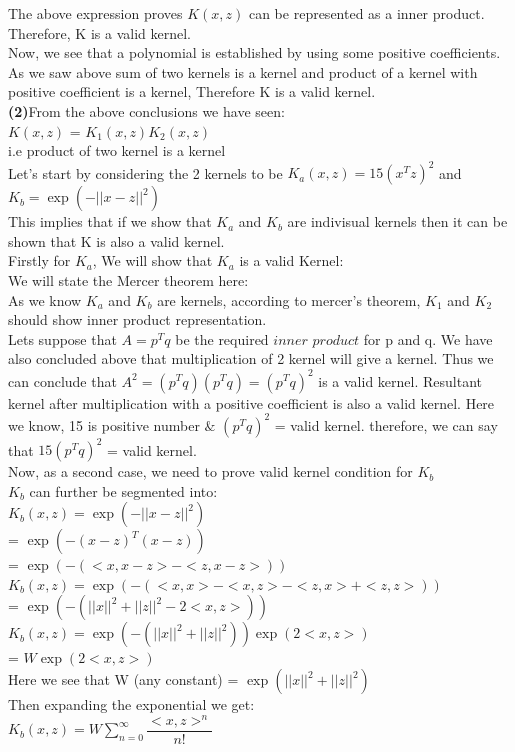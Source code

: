 \documentclass[11pt]{article}
\renewcommand\part[1]{\vspace{.10in}\textbf{(#1)}}
\begin{document}
The above expression proves $K(x,z)$ can be represented as a inner product. Therefore, K is a valid kernel.\\
Now, we see that a polynomial is established by using some positive coefficients. As we saw above sum of two kernels is a kernel and product of a kernel with positive coefficient is a kernel, Therefore K is a valid kernel.\\


\part{2}From the above conclusions we have seen:\\
$K(x,z)$ = $K_{1}(x,z)K_{2}(x,z)$\\
i.e product of two kernel is a kernel\\
Let's start by considering the 2 kernels to be $K_a(x,z) = 15(x^Tz)^2$ and $K_b = \exp(-||x-z||^2)$\\
This implies that if we show that $K_a$ and $K_b$ are indivisual kernels then it can be shown that K is also a valid kernel.\\
Firstly for $K_a$, We will show that $K_a$ is a valid Kernel:\\
We will state the Mercer theorem here:\\
As we know $K_a$ and $K_b$ are kernels, according to mercer's theorem, $K_1$ and $K_2$ should show inner product representation.\\

Lets suppose that $A=p^Tq$ be the required $inner$ $product$ for p and q. We have also concluded above that multiplication of 2 kernel will give a kernel. Thus we can conclude that $A^2 = (p^Tq)(p^Tq) = (p^Tq)^2$ is a valid kernel. Resultant kernel after multiplication with a positive coefficient is also a valid kernel. Here we know, 15 is positive number $\&$ $(p^Tq)^2$ = valid kernel. therefore, we can say that $15(p^Tq)^2$ = valid kernel.\\

Now, as a second case, we need to prove valid kernel condition for $K_b$\\
$K_b$ can further be segmented into:\\
    $K_b(x,z) = \exp(-||x-z||^2)$\\
     = $\exp(-(x-z)^T(x-z))$\\
     = $\exp(-(<x,x-z> - <z,x-z>)) $\\[15pt]
    $K_b(x,z) = \exp(-(<x,x> - <x,z> - <z,x> + <z,z>))$\\
     = $\exp(-(||x||^2 + ||z||^2 - 2<x,z>))$\\[15pt]
    $K_b(x,z) = \exp(-(||x||^2 + ||z||^2)) \exp(2<x,z>)$\\
     = $W\exp(2<x,z>)$\\
    	Here we see that W (any constant) = $\exp(||x||^2 + ||z||^2)$\\
	Then expanding the exponential we get:\\
    $K_b(x,z) = W \sum_{n=0}^\infty \dfrac{<x,z>^n}{n!}$
\end{document}
